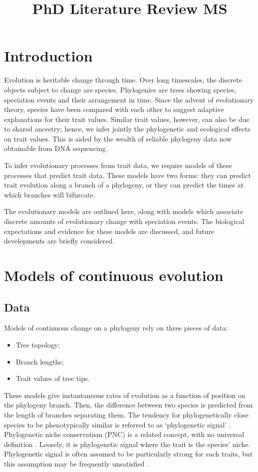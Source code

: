 \documentclass[12pt]{article}
\title{PhD Literature Review MS}
\date{}
\author{}
\begin{document}
\maketitle
\tableofcontents
\newpage

\section{Introduction}

Evolution is heritable change through time. 
Over long timescales, the discrete objects subject to change are species. 
Phylogenies are trees showing species, speciation events and their arrangement in time.
Since the advent of evolutionary theory, species have been compared with each other to suggest adaptive explanations for their trait values. 
Similar trait values, however, can also be due to shared ancestry; hence, we infer jointly the phylogenetic and ecological effects on trait values. 
This is aided by the wealth of reliable phylogeny data now obtainable from DNA sequencing.

To infer evolutionary processes from trait data, we require models of these processes that predict trait data. 
These models have two forms: they can predict trait evolution along a branch of a phylogeny, or they can predict the times at which branches will bifurcate. 

The evolutionary models are outlined here, along with models which associate discrete amounts of evolutionary change with speciation events. 
The biological expectations and evidence for these models are discussed, and future developments are briefly considered.

\section{Models of continuous evolution}

\subsection{Data}

Models of continuous change on a phylogeny rely on three pieces of data:
\begin{itemize}
  \item Tree topology;
  \item Branch lengths;
  \item Trait values of tree tips.
\end{itemize}

These models give instantaneous rates of evolution as a function of position on the phylogeny branch. 
Then, the difference between two species is predicted from the length of branches separating them. 
The tendency for phylogenetically close species to be phenotypically similar is referred to as `phylogenetic signal' \citep{blomberg_testing_2003}. 
Phylogenetic niche conservatism (PNC) is a related concept, with no universal definition \citep{cooper_phylogenetic_2010}. 
Loosely, it is phylogenetic signal where the trait is the species' niche. 
Phylogenetic signal is often assumed to be particularly strong for such traits, but this assumption may be frequently unsatisfied \citep{losos_phylogenetic_2008}. 
\end{document}
